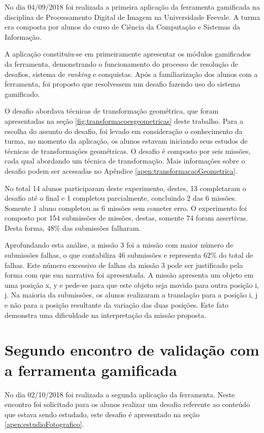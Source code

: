 \documentclass[
	12pt,				%
	oneside,			%
	a4paper,			%
	english,			%
	french,				%
	spanish,			%
	brazil,				%
	]{abntex2}
\begin{document}
No dia 04/09/2018 foi realizada a primeira aplicação da ferramenta gamificada na disciplina de Processamento Digital de Imagem na Universidade Feevale. A turma era composta por alunos do curso de Ciência da Computação e Sistemas da Informação.

A aplicação constituiu-se em primeiramente apresentar os módulos gamificados da ferramenta, demonstrando o funcionamento do processo de resolução de desafios, sistema de \textit{ranking} e conquistas. Após a familiarização dos alunos com a ferramenta, foi proposto que resolvessem um desafio fazendo uso do sistema gamificado.

O desafio abordava técnicas de transformação geométrica, que foram apresentadas na seção \ref{fig:transformacoesgeometricas} deste trabalho. Para a escolha do assunto do desafio, foi levado em consideração o conhecimento da turma, no momento da aplicação, os alunos estavam iniciando seus estudos de técnicas de transformações geométricas. O desafio é composto por seis missões, cada qual abordando um técnica de transformação. Mais informações sobre o desafio podem ser acessadas no Apêndice \ref{apen:transformacaoGeometrica}.

No total 14 alunos participaram deste experimento, destes, 13 completaram o desafio até o final e 1 completou parcialmente, concluindo 2 das 6 missões. Somente 1 aluno completou as 6 missões sem cometer erro. O experimento foi composto por 154 submissões de missões, destas, somente 74 foram assertivas. Desta forma, 48\% das submissões falharam.

Aprofundando esta análise, a missão 3 foi a missão com maior número de submissões falhas, o que contabiliza 46 submissões e representa 62\% do total de falhas. Este número excessivo de falhas da missão 3 pode ser justificado pela forma com que sua narrativa foi apresentada. A missão apresenta um objeto em uma posição x, y e pede-se para que este objeto seja movido para outra posição i, j. Na maioria da submissões, os alunos realizaram a translação para a posição i, j e não para a posição resultante da variação das duas posições. Este fato demonstra uma dificuldade na interpretação da missão proposta.

\section{Segundo encontro de validação com a ferramenta gamificada}

No dia 02/10/2018 foi realizada a segunda aplicação da ferramenta. Neste encontro foi solicitado para os alunos realizar um desafio referente ao conteúdo que estava sendo estudado, este desafio é apresentado na seção \ref{apen:estudioFotografico}.
\end{document}
